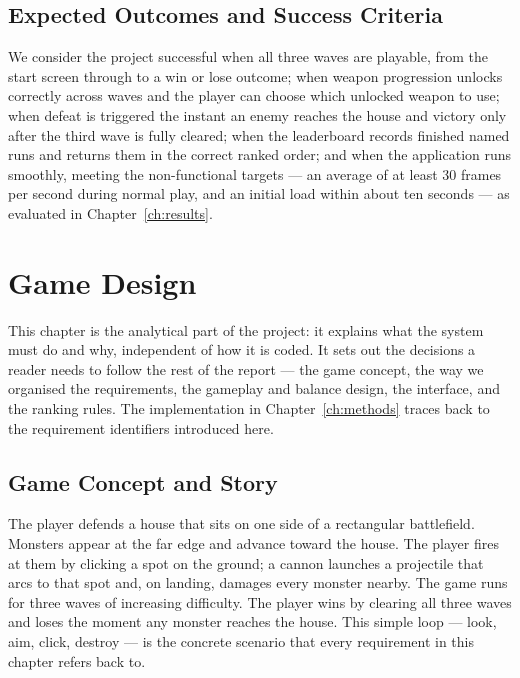 \documentclass[12pt,a4paper]{report}
\begin{document}
\section{Expected Outcomes and Success Criteria}

We consider the project successful when all three waves are playable, from the
start screen through to a win or lose outcome; when weapon progression unlocks
correctly across waves and the player can choose which unlocked weapon to use;
when defeat is triggered the instant an enemy reaches the house and victory only
after the third wave is fully cleared; when the leaderboard records finished
named runs and returns them in the correct ranked order; and when the
application runs smoothly, meeting the non-functional targets --- an average of
at least 30 frames per second during normal play, and an initial load within
about ten seconds --- as evaluated in Chapter~\ref{ch:results}.

\chapter{Game Design}\label{ch:design}

This chapter is the analytical part of the project: it explains what the system
must do and why, independent of how it is coded. It sets out the decisions a
reader needs to follow the rest of the report --- the game concept, the way we
organised the requirements, the gameplay and balance design, the interface, and
the ranking rules. The implementation in Chapter~\ref{ch:methods} traces back to
the requirement identifiers introduced here.

\section{Game Concept and Story}

The player defends a house that sits on one side of a rectangular battlefield.
Monsters appear at the far edge and advance toward the house. The player fires
at them by clicking a spot on the ground; a cannon launches a projectile that
arcs to that spot and, on landing, damages every monster nearby. The game runs
for three waves of increasing difficulty. The player wins by clearing all three
waves and loses the moment any monster reaches the house. This simple loop ---
look, aim, click, destroy --- is the concrete scenario that every requirement in
this chapter refers back to.
\end{document}
